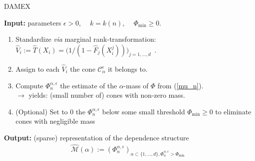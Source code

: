 \begin{algorithm}[!tbh]
\caption{DAMEX}
\label{DAMEX-algo}
{\bf Input:} parameters $\epsilon>0$,~~ $k = k(n)$,~~ $\Phi_{\min}\geq 0$.
\begin{enumerate}
\item Standardize \emph{via} marginal rank-transformation: $\hat V_i := \hat T(X_i) =  \big (1/(1- \hat F_j (X_i^j))\big)_{j=1,\ldots,d}$~. %
\item Assign to each $\hat V_i$ the cone $\mathcal{C}_\alpha^\epsilon$
  it belongs to.  
\item Compute  $\Phi_n^{\alpha, \epsilon}$ the estimate of the $\alpha$-mass of $\Phi$ from (\ref{mu_n}).\\
 $\rightarrow$ yields: (small number of) cones with non-zero mass.
\item (Optional) Set to $0$ the $\Phi_n^{\alpha,\epsilon}$ below some small
  threshold $\Phi_{\min}\ge 0$ to eliminate cones with negligible mass
   
\end{enumerate}
{\bf Output:} (sparse) representation of the dependence
  structure %
 \begin{align*}
\widehat{\mathcal{M}}(\alpha) := (\Phi_n^{\alpha,\epsilon})_{\alpha\subset\{1,\ldots, d\}, \Phi_n^{\alpha,\epsilon}>\Phi_{\min}}
 \end{align*}

\end{algorithm}

